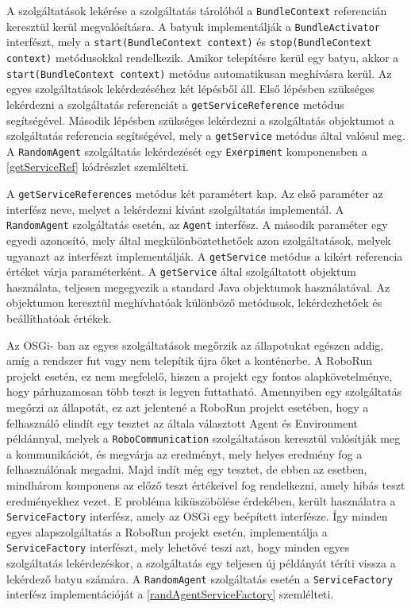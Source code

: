 A szolgáltatások lekérése a szolgáltatás tárolóból a \texttt{BundleContext} referencián keresztül kerül megvalósításra. A batyuk implementálják a \texttt{BundleActivator} interfészt, mely a \texttt{start(BundleContext context)} és \texttt{stop(BundleContext context)} metódusokkal rendelkezik. Amikor telepítésre kerül egy batyu, akkor a \texttt{start(BundleContext context)} metódus automatikusan meghívásra kerül. Az egyes szolgáltatások lekérdezéséhez két lépésből áll. Első lépésben szükséges lekérdezni a szolgáltatás referenciát a \texttt{getServiceReference} metódus segítségével. Második lépésben szükséges lekérdezni a szolgáltatás objektumot a szolgáltatás referencia segítségével, mely a \texttt{getService} metódus által valósul meg. A \texttt{RandomAgent} szolgáltatás lekérdezését egy \texttt{Exerpiment} komponensben a \ref{getServiceRef} kódrészlet szemlélteti. 

%


A \texttt{getServiceReferences} metódus két paramétert kap. Az első paraméter az interfész neve, melyet a lekérdezni kívánt szolgáltatás implementál. A \texttt{RandomAgent} szolgáltatás esetén, az \texttt{Agent} interfész. A második paraméter egy egyedi azonosító, mely által megkülönböztethetőek azon szolgáltatások, melyek ugyanazt az interfészt implementálják. 
A \texttt{getService} metódus a kikért referencia értéket várja paraméterként. A \texttt{getService} által szolgáltatott objektum használata, teljesen megegyezik a standard Java objektumok használatával. Az objektumon keresztül meghívhatóak különböző metódusok, lekérdezhetőek és beállíthatóak értékek. 

Az OSGi- ban az egyes szolgáltatások megőrzik az állapotukat egészen addig, amíg a rendszer fut vagy nem telepítik újra őket a konténerbe. A RoboRun projekt esetén, ez nem megfelelő, hiszen a projekt egy fontos alapkövetelménye, hogy párhuzamosan több teszt is legyen futtatható. Amennyiben egy szolgáltatás megőrzi az állapotát, ez azt jelentené a RoboRun projekt esetében, hogy a felhasználó elindít egy tesztet az általa választott Agent és Environment példánnyal, melyek a \texttt{RoboCommunication} szolgáltatáson keresztül valósítják meg a kommunikációt, és megvárja az eredményt, mely helyes eredmény fog a felhasználónak megadni. Majd indít még egy tesztet, de ebben az esetben, mindhárom komponens az előző teszt értékeivel fog rendelkezni, amely hibás teszt eredményekhez vezet. E probléma kiküszöbölése érdekében, került használatra a  \texttt{ServiceFactory} interfész, amely az OSGi egy beépített interfésze. Így minden egyes alapszolgáltatás a RoboRun projekt esetén, implementálja a  \texttt{ServiceFactory} interfészt, mely lehetővé teszi azt, hogy minden egyes szolgáltatás lekérdezéskor, a szolgáltatás egy teljesen új példányát téríti vissza a lekérdező batyu számára. A \texttt{RandomAgent} szolgáltatás esetén a \texttt{ServiceFactory} interfész implementációját a \ref{randAgentServiceFactory} szemlélteti.

